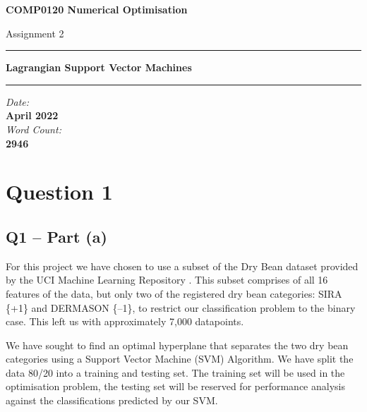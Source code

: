 \documentclass{article}
\newcommand{\HorRule}{\color{Black}\rule{14cm}{1pt}} %
\begin{document}
\begin{titlepage}
   \begin{center}
        \vspace*{2cm}
        \LARGE
        \textbf{COMP0120 Numerical Optimisation}

        \Large
        \vspace{1cm}
        Assignment 2
        \vspace{0.5cm}
        \HorRule
        
        \vspace{4cm}
        \textbf{Lagrangian Support Vector Machines}

        \large
        \vspace{4cm}
        \HorRule
        \vspace{1cm}
        \textit{Date:\\} \textbf{April 2022} \\
        \vspace{0.5cm}
        \textit{Word Count:\\} \textbf{2946} \\ \text{(\LaTeX)}
            
   \end{center}
\end{titlepage}

\section{Question 1}

\subsection*{\textbf{Q1 – Part (a)}}
\normalsize

For this project we have chosen to use a subset of the Dry Bean dataset provided by the UCI Machine Learning Repository \cite{misc_dry_bean_dataset_602}. This subset comprises of all 16 features of the data, but only two of the registered dry bean categories: SIRA \{+1\} and DERMASON \{–1\}, to restrict our classification problem to the binary case. This left us with approximately 7,000 datapoints. \par

We have sought to find an optimal hyperplane that separates the two dry bean categories using a Support Vector Machine (SVM) Algorithm. We have split the data 80/20 into a training and testing set. The training set will be used in the optimisation problem, the testing set will be reserved for performance analysis against the classifications predicted by our SVM.
\end{document}
